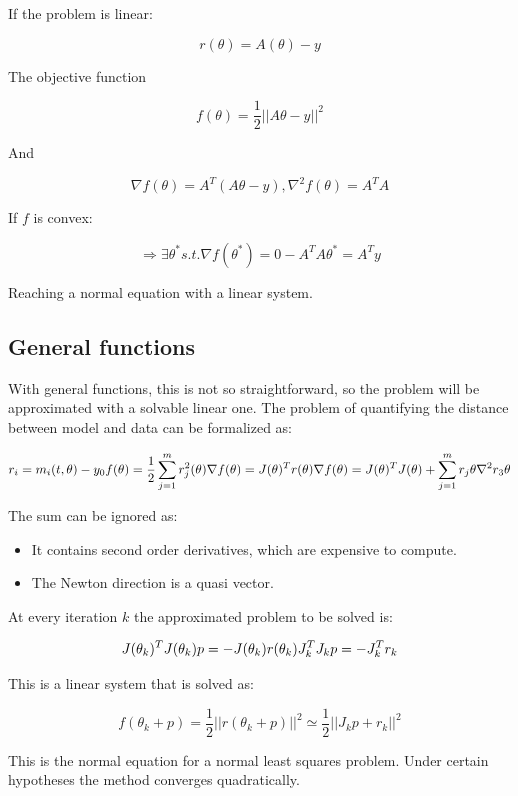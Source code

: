   If the problem is linear:

  $$r(\theta)=A(\theta)-y$$

  The objective function

  $$f(\theta)=\frac{1}{2} || A\theta-y||^2$$

  And

  $$\nabla f(\theta)=A^T(A\theta-y), \nabla^2 f(\theta)=A^TA$$

  If $f$ is convex:

  $$\Rightarrow \exists \theta^* s.t. \nabla f(\theta^*)=0 - A^TA\theta^*=A^Ty$$

  Reaching a normal equation with a  linear system.

  \subsection{General functions}
  With general functions, this is not so straightforward, so the problem will be approximated with a solvable linear one.
  The problem of quantifying the distance between model and data can be formalized as:

  $$r_i = m_i(t,\theta) - y_0 \\ f(\theta)= \frac{1}{2} \sum^m_{j=1} r_j^2 (\theta) \\ \nabla f(\theta) = J(\theta)^{T} r (\theta) \\ \nabla f(\theta) = J(\theta)^{T} J (\theta) + \sum^m_{j=1} r_j \theta \nabla^2 r_3 \theta$$

  The sum can be ignored as:

  \begin{multicols}{2}
    \begin{itemize}
      \item It contains second order derivatives, which are expensive to compute.
      \item The Newton direction is a quasi vector.
    \end{itemize}
  \end{multicols}

  At every iteration $k$ the approximated problem to be solved is:

  $$J(\theta_k)^TJ(\theta_k)p=-J(\theta_k)r(\theta_k) \\ J_k^TJ_kp=-J_k^T r_k$$

  This is a linear system that is solved as:

  $$f(\theta_k+p)= \frac{1}{2} ||r(\theta_k+p)||^2 \simeq \frac{1}{2} ||J_kp+r_k||^2$$

  This is the normal equation for a normal least squares problem.
  Under certain hypotheses the method converges quadratically.

